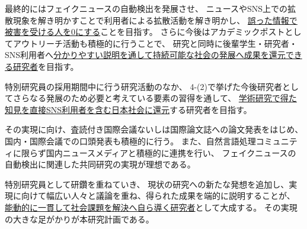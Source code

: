 \begin{spacing}{1.08}
最終的にはフェイクニュースの自動検出を発展させ、
ニュースやSNS上での拡散現象を解き明かすことで利用者による拡散活動を解き明かし、
\underline{誤った情報で被害を受ける人を0にする}ことを目指す。
さらに今後はアカデミックポストとしてアウトリーチ活動も積極的に行うことで、
研究と同時に後輩学生・研究者・SNS利用者へ\underline{分かりやすい説明を通して持続可能な社会の発展へ成果を還元できる研究者}を目指す。


\vspace{5mm}
\noindent
{}

特別研究員の採用期間中に行う研究活動のなか、
4-(2)で挙げた今後研究者としてさらなる発展のため必要と考えている要素の習得を通して、
\underline{学術研究で得た知見を直接SNS利用者を含む日本社会に還元}する研究者を目指す。

その実現に向け、査読付き国際会議ないしは国際論文誌への論文発表をはじめ、
国内・国際会議での口頭発表も積極的に行う。
また、自然言語処理コミュニティに限らず国内ニュースメディアと積極的に連携を行い、
フェイクニュースの自動検出に関連した共同研究の実現が理想である。

特別研究員として研鑽を重ねていき、
現状の研究への新たな発想を追加し、実現に向けて幅広い人々と議論を重ね、得られた成果を端的に説明することが、
\underline{能動的に一貫して社会課題を解決へ自ら導く研究者}として大成する。
その実現の大きな足がかりが本研究計画である。
\end{spacing}



